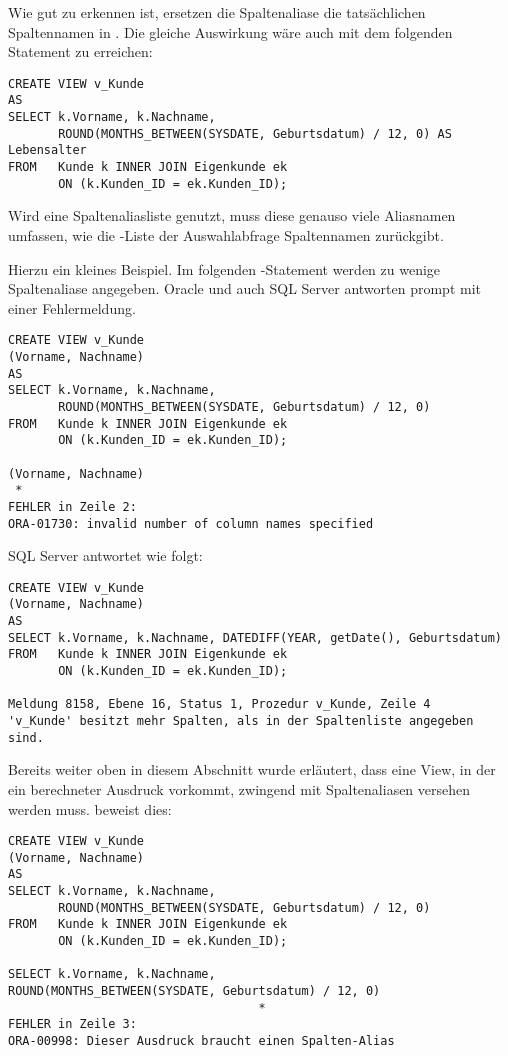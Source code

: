 Wie gut zu erkennen ist, ersetzen die Spaltenaliase die tatsächlichen Spaltennamen in . Die gleiche Auswirkung wäre auch mit dem folgenden Statement zu erreichen:
\begin{lstlisting}[language=oracle_sql,caption={Eine einfache View mit Spaltenaliasen},label=sql08_30]
CREATE VIEW v_Kunde
AS
SELECT k.Vorname, k.Nachname,
       ROUND(MONTHS_BETWEEN(SYSDATE, Geburtsdatum) / 12, 0) AS Lebensalter
FROM   Kunde k INNER JOIN Eigenkunde ek
       ON (k.Kunden_ID = ek.Kunden_ID);
        \end{lstlisting}
\begin{merke}
    Wird eine Spaltenaliasliste genutzt, muss diese genauso viele Aliasnamen umfassen, wie die \SELECT-Liste der Auswahlabfrage Spaltennamen zurückgibt.
\end{merke}
Hierzu ein kleines Beispiel. Im folgenden -Statement werden zu wenige Spaltenaliase angegeben. Oracle und auch SQL Server antworten prompt mit einer Fehlermeldung.
\clearpage
\begin{lstlisting}[language=oracle_sql,caption={Eine einfache View mit fehlerhafter Spaltenaliasliste in Oracle},label=sql08_31]
CREATE VIEW v_Kunde
(Vorname, Nachname)
AS
SELECT k.Vorname, k.Nachname,
       ROUND(MONTHS_BETWEEN(SYSDATE, Geburtsdatum) / 12, 0)
FROM   Kunde k INNER JOIN Eigenkunde ek
       ON (k.Kunden_ID = ek.Kunden_ID);

(Vorname, Nachname)
 *
FEHLER in Zeile 2:
ORA-01730: invalid number of column names specified
        \end{lstlisting}
SQL Server antwortet wie folgt:
\begin{lstlisting}[language=ms_sql,caption={Eine einfache View mit fehlerhafter Spaltenaliasliste in SQL Server},label=sql08_32]
CREATE VIEW v_Kunde
(Vorname, Nachname)
AS
SELECT k.Vorname, k.Nachname, DATEDIFF(YEAR, getDate(), Geburtsdatum)
FROM   Kunde k INNER JOIN Eigenkunde ek
       ON (k.Kunden_ID = ek.Kunden_ID);

Meldung 8158, Ebene 16, Status 1, Prozedur v_Kunde, Zeile 4
'v_Kunde' besitzt mehr Spalten, als in der Spaltenliste angegeben sind.
        \end{lstlisting}
Bereits weiter oben in diesem Abschnitt wurde erläutert, dass eine View, in der ein berechneter Ausdruck vorkommt, zwingend mit Spaltenaliasen versehen werden muss.  beweist dies:
\begin{lstlisting}[language=oracle_sql,caption={Eine View mit einer berechneten Spalte in Oracle},label=sql08_33]
CREATE VIEW v_Kunde
(Vorname, Nachname)
AS
SELECT k.Vorname, k.Nachname,
       ROUND(MONTHS_BETWEEN(SYSDATE, Geburtsdatum) / 12, 0)
FROM   Kunde k INNER JOIN Eigenkunde ek
       ON (k.Kunden_ID = ek.Kunden_ID);

SELECT k.Vorname, k.Nachname,
ROUND(MONTHS_BETWEEN(SYSDATE, Geburtsdatum) / 12, 0)
                                   *
FEHLER in Zeile 3:
ORA-00998: Dieser Ausdruck braucht einen Spalten-Alias
        \end{lstlisting}
